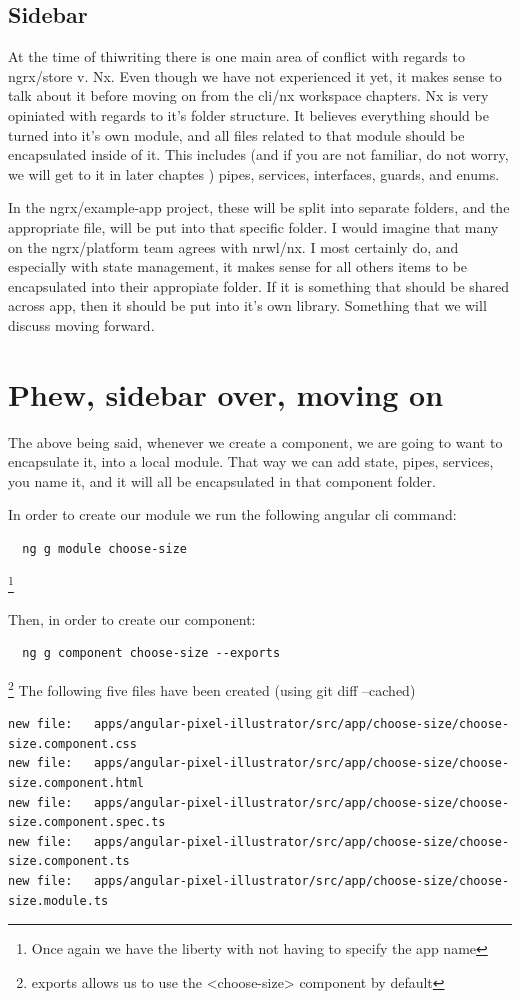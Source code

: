 \subsection {Sidebar}
At the time of thiwriting there is one main area of conflict with regards to
ngrx/store v. Nx. Even though we have not experienced it yet, it makes sense to
talk about it before moving on from the cli/nx workspace chapters. Nx is very
opiniated with regards to it's folder structure. It believes everything should
be turned into it's own module, and all files related to that module should
be encapsulated inside of it. This includes (and if you are not familiar, do not
worry, we will get to it in later chaptes ) pipes, services, interfaces, guards,
and enums.

In the ngrx/example-app project, these will be split into separate folders, and
the appropriate file, will be put into that specific folder. I would imagine
that many on the ngrx/platform team agrees with nrwl/nx. I most certainly do,
and especially with state management, it makes sense for all others items to
be encapsulated into their appropiate folder. If it is something that should be
shared across app, then it should be put into it's own library. Something that
we will discuss moving forward.

\section {Phew, sidebar over, moving on}

The above being said, whenever we create a component, we are going to want to
encapsulate it, into a local module. That way we can add state, pipes, services,
you name it, and it will all be encapsulated in that component folder.

In order to create our module we run the following angular cli command:

\begin{verbatim}
  ng g module choose-size
\end{verbatim}
\footnote{Once again we have the liberty with not having to
specify the app name}

Then, in order to create our component:
\begin{verbatim}
  ng g component choose-size --exports
\end{verbatim}
\footnote{exports allows us to use the <choose-size> component by default}
The following five files have been created (using git diff --cached)
\begin{lstlisting}[breaklines]
new file:   apps/angular-pixel-illustrator/src/app/choose-size/choose-size.component.css
new file:   apps/angular-pixel-illustrator/src/app/choose-size/choose-size.component.html
new file:   apps/angular-pixel-illustrator/src/app/choose-size/choose-size.component.spec.ts
new file:   apps/angular-pixel-illustrator/src/app/choose-size/choose-size.component.ts
new file:   apps/angular-pixel-illustrator/src/app/choose-size/choose-size.module.ts
\end{lstlisting}
